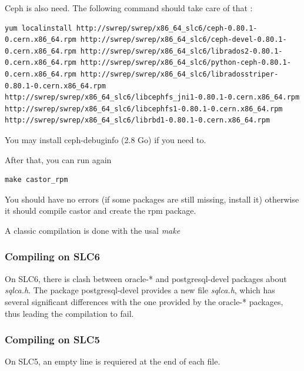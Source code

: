 Ceph is also need. The following command should take care of that : 
\begin{table}[h]
\begin{lstlisting}
yum localinstall http://swrep/swrep/x86_64_slc6/ceph-0.80.1-0.cern.x86_64.rpm http://swrep/swrep/x86_64_slc6/ceph-devel-0.80.1-0.cern.x86_64.rpm http://swrep/swrep/x86_64_slc6/librados2-0.80.1-0.cern.x86_64.rpm http://swrep/swrep/x86_64_slc6/python-ceph-0.80.1-0.cern.x86_64.rpm http://swrep/swrep/x86_64_slc6/libradosstriper-0.80.1-0.cern.x86_64.rpm http://swrep/swrep/x86_64_slc6/libcephfs_jni1-0.80.1-0.cern.x86_64.rpm http://swrep/swrep/x86_64_slc6/libcephfs1-0.80.1-0.cern.x86_64.rpm http://swrep/swrep/x86_64_slc6/librbd1-0.80.1-0.cern.x86_64.rpm
\end{lstlisting}
\end{table}

You may install ceph-debuginfo (2.8 Go) if you need to.

After that, you can run again
\begin{table}[h]
\begin{lstlisting}
make castor_rpm
\end{lstlisting}
\end{table}

You should have no errors (if some packages are still missing, install it) otherwise it should compile castor and create the rpm package.

A classic compilation is done with the usal \textit{make}
\subsubsection{Compiling on SLC6}
On SLC6, there is clash between oracle-*  and postgresql-devel packages about \textit{sqlca.h}.
The package postgresql-devel provides a new file \textit{sqlca.h}, which has several significant 
differences with the one provided by the oracle-* packages, thus leading the compilation to fail.

\subsubsection{Compiling on SLC5}
On SLC5, an empty line is requiered at the end of each file.
